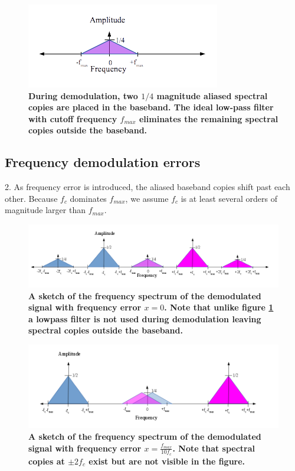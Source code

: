 \documentclass[letterpaper,12pt]{article}
\begin{document}
\begin{figure}[hbtp]
\includegraphics[width=0.8\columnwidth]{prelab1-figure1b}
\caption{
\label{fig:prelab1-figure1b}
{\bf During demodulation, two $1/4$ magnitude aliased spectral copies are
placed in the baseband. The ideal low-pass filter with cutoff frequency
$f_{max}$ eliminates the remaining spectral copies outside the baseband.
}
}
\end{figure}
\pagebreak

\subsection*{Frequency demodulation errors}

2. As frequency error is introduced, the aliased baseband copies shift past each
other.  Because $f_{c}$ dominates $f_{max}$, we assume $f_{c}$ is at least
several orders of magnitude larger than $f_{max}$.

\begin{figure}[hbtp]
\includegraphics[width=1.0\columnwidth]{prelab1-figure2a}
\caption{
\label{fig:prelab1-figure2a}
{\bf A sketch of the frequency spectrum of the demodulated signal with
frequency error $x=0$. Note that unlike figure \ref{fig:prelab1-figure1b} a lowpass
filter is not used during demodulation leaving spectral copies outside the
baseband.
}
}
\end{figure}

\begin{figure}[hbtp]
\includegraphics[width=1.0\columnwidth]{prelab1-figure2b}
\caption{
\label{fig:prelab1-figure2b}
{\bf A sketch of the frequency spectrum of the demodulated signal with
frequency error $x=\frac{f_{max}}{10f_{c}}$. Note that spectral copies at
$\pm2f_{c}$ exist but are not visible in the figure.
}
}
\end{figure}
\end{document}
